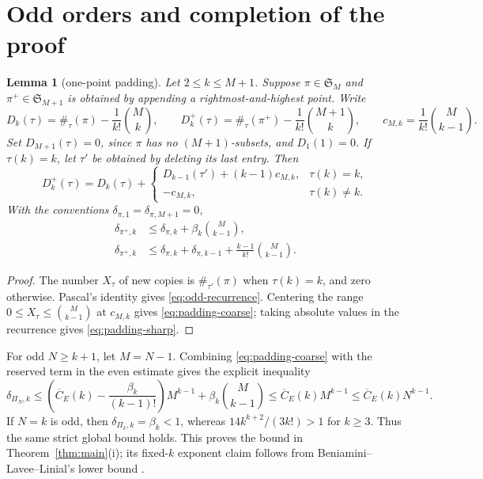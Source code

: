 \documentclass[11pt,letterpaper]{article}
\newtheorem{lemma}[theorem]{Lemma}
\newcommand{\Ssym}{\mathfrak S}
\begin{document}
\section{Odd orders and completion of the proof}\label{sec:odd-orders}

\begin{lemma}[one-point padding]\label{lem:padding}
Let $2\leq k\leq M+1$.  Suppose $\pi\in\Ssym_M$ and
$\pi^+\in\Ssym_{M+1}$ is obtained by appending a
rightmost-and-highest point.  Write
\[
 D_k(\tau)=\#_\tau(\pi)-\frac1{k!}\binom Mk,
 \qquad
 D_k^+(\tau)=\#_\tau(\pi^+)-\frac1{k!}\binom{M+1}k,
 \qquad
 c_{M,k}=\frac1{k!}\binom M{k-1}.
\]
Set $D_{M+1}(\tau)=0$, since $\pi$ has no $(M+1)$-subsets, and
$D_1(1)=0$.
If $\tau(k)=k$, let $\tau'$ be obtained by deleting its last entry.  Then
\begin{equation}\label{eq:odd-recurrence}
 D_k^+(\tau)=D_k(\tau)+
 \begin{cases}
  D_{k-1}(\tau')+(k-1)c_{M,k},&\tau(k)=k,\\
  -c_{M,k},&\tau(k)\ne k.
 \end{cases}
\end{equation}
With the conventions $\delta_{\pi,1}=\delta_{\pi,M+1}=0$,
\begin{align}
 \delta_{\pi^+,k}
 &\leq \delta_{\pi,k}
   +\beta_k\binom{M}{k-1},
 \label{eq:padding-coarse}\\
 \delta_{\pi^+,k}
 &\leq \delta_{\pi,k}+\delta_{\pi,k-1}
   +\frac{k-1}{k!}\binom{M}{k-1}.
 \label{eq:padding-sharp}
\end{align}
\end{lemma}

\begin{proof}
The number $X_\tau$ of new copies is $\#_{\tau'}(\pi)$ when
$\tau(k)=k$, and zero otherwise.  Pascal's identity gives
\eqref{eq:odd-recurrence}.  Centering the range
$0\le X_\tau\le\binom M{k-1}$ at $c_{M,k}$ gives
\eqref{eq:padding-coarse}; taking absolute values in the recurrence gives
\eqref{eq:padding-sharp}.
\end{proof}

For odd $N\geq k+1$, let $M=N-1$.  Combining
\eqref{eq:padding-coarse} with the reserved term in the even estimate gives
the explicit inequality
\[
 \delta_{\Pi_N,k}
 \leq\left(\overline C_E(k)-\frac{\beta_k}{(k-1)!}\right)M^{k-1}
      +\beta_k\binom{M}{k-1}
 \leq \overline C_E(k)M^{k-1}
 \leq \overline C_E(k)N^{k-1}.
\]
If $N=k$ is odd, then
$\delta_{\Pi_k,k}=\beta_k<1$, whereas
$14k^{k+2}/(3k!)>1$ for $k\ge3$. Thus the same strict global bound holds.
This proves the bound in Theorem~\ref{thm:main}(i); its fixed-$k$ exponent
claim follows from Beniamini--Lavee--Linial's lower bound
\cite[Theorem~7]{BLL}.
\end{document}

